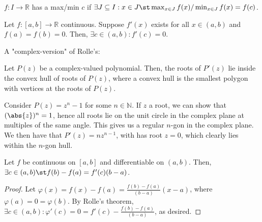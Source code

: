 \begin{definition}
    $f: I \to \mathbb{R}$ has a max/min $c$ if $\exists J \subseteq I : x \in J \st \max_{x \in J} f(x) /\min_{x \in J}f(x)= f(c)$.
\end{definition}

\begin{theorem}[Rolle's]\label{thm:rolles}
    Let $f:[a,b]\to \mathbb{R}$ continuous. Suppose $f'(x)$ exists for all $x \in (a,b)$ and $f(a) = f(b) = 0$. Then, $\exists c \in (a, b) : f'(c) = 0$.
\end{theorem}
\begin{remark}
    A "complex-version" of Rolle's:
\end{remark}

\begin{theorem}
   Let $P(z)$ be a complex-valued polynomial. Then, the roots of $P'(z)$ lie inside the convex hull of roots of $P(z)$, where a convex hull is the smallest polygon with vertices at the roots of $P(z)$.
\end{theorem}
\begin{definition}
    Consider $P(z) = z^{n} - 1$ for some $n \in \mathbb{N}$. If $z$ a root, we can show that $(\abs{z})^n = 1$, hence all roots lie on the unit circle in the complex plane at multiples of the same angle. This gives us a regular $n$-gon in the complex plane. We then have that $P'(z) = nz^{n-1}$, with has root $z = 0$, which clearly lies within the $n$-gon hull.
\end{definition}

\begin{theorem}\label{thm:meanvalue}
    Let $f$ be continuous on $[a,b]$ and differentiable on $(a, b)$. Then, $\exists c \in (a, b) \st f(b) - f(a)=f'(c)(b-a)$.
\end{theorem}
\begin{proof}
    Let $\varphi(x) = f(x) - f(a) = \frac{f(b)-f(a)}{(b-a)}(x-a)$, where $\varphi(a) = 0 = \varphi(b)$. By Rolle's theorem, $\exists c \in (a, b) : \varphi'(c) = 0 = f'(c) - \frac{f(b)-f(a)}{(b-a)}$, as desired.
\end{proof}
